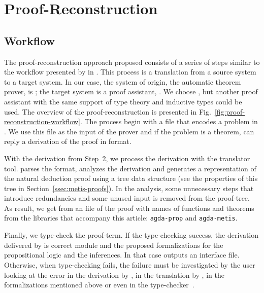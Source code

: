 \documentclass[../main.tex]{subfiles}
\begin{document}

\section{Proof-Reconstruction}
\label{sec:proof-reconstruction}

\subsection{Workflow}
\label{ssec:workflow}



The proof-reconstruction approach proposed consists of a series
of steps similar to the workflow presented by \citeauthor{sultana2015} in
\cite{sultana2015}. This process is a translation from a source
system to a target system. In our case, the system of origin, the
automatic theorem prover, is \Metis; the target system is a proof
assistant, \Agda. We choose \Agda, but another proof assistant with the
same support of type theory and inductive types could be used.
The overview of the proof-reconstruction is presented in
Fig.~\ref{fig:proof-reconstruction-workflow}. The process begin with
a \TPTP file that encodes a problem in \CPL. We use this file as the
input of the \Metis prover and if the problem is a theorem, \Metis can
reply a derivation of the proof in \TSTP format.

With the \TSTP derivation from Step~2, we process the derivation with the
\Athena translator tool.
\Athena parses the \TSTP format, analyzes the
derivation and generates a representation of the natural deduction
proof using a tree data structure (see the properties
of this tree in Section~\ref{ssec:metis-proofs}).
In the \Athena analysis, some unnecessary steps that introduce redundancies
and some unused input is removed from the proof-tree.
As result, we get from \Athena an \Agda file of the proof
with names of functions and theorems from
the \Agda libraries that accompany this article:
\texttt{agda-prop} and \texttt{agda-metis}.

Finally, we type-check the \Agda proof-term. If the type-checking
success, the \TSTP derivation delivered by \Metis is correct
module \Agda and the proposed formalizations for the
propositional logic and the \Metis inferences.
In that case \Agda outputs an interface file.
Otherwise, when type-checking fails, the failure must be
investigated by the user looking at the error in the \TSTP derivation
by \Metis, in the translation by \Athena, in the \Agda formalizations
mentioned above or even in the type-checker~\Agda.
\end{document}
